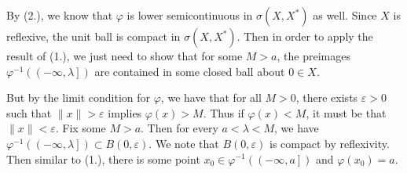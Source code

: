 \documentclass[11pt, reqno]{article}
\theoremstyle{plain}
\theoremstyle{definition}
\theoremstyle{remark}
\renewcommand{\phi}{\varphi}
\renewcommand{\epsilon}{\varepsilon}
\begin{document}
\begin{enumerate}
    By (2.), we know that $\phi$ is lower semicontinuous in $\sigma(X, X^*)$ as well. Since $X$ is 
    reflexive, the unit ball is compact in $\sigma(X,X^*)$. Then in order to apply
    the result of (1.), we just need to show that for some $M > a$, the preimages 
    $\phi^{-1}(\left(-\infty, \lambda\right])$ are contained in some closed ball about $0 \in X$. 

    But by the limit condition for $\phi$, we have that for all $M > 0$, there exists $\epsilon > 0$ 
    such that $\|x\| > \epsilon$ implies $\phi(x) > M$. Thus if $\phi(x) < M$, it must be that 
    $\|x\| < \epsilon$. Fix some $M > a$. Then for every $a < \lambda < M$, we have $\phi^{-1}(\left(-\infty, \lambda\right])
    \subset B(0, \epsilon)$. We note that $B(0, \epsilon)$ is compact by reflexivity. Then 
    similar to (1.), there is some point $x_0 \in \phi^{-1}(\left(-\infty, a\right])$ and 
    $\phi(x_0) = a$. 
\end{enumerate}
\end{document}

